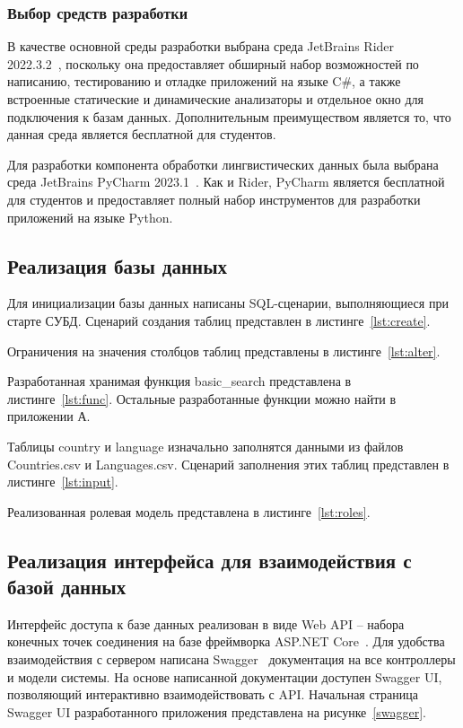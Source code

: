 \subsubsection{Выбор средств разработки}

В качестве основной среды разработки выбрана среда JetBrains Rider\\ 2022.3.2~\cite{rider}, поскольку она предоставляет обширный набор возможностей по написанию, тестированию и отладке приложений на языке C$\#$, а также встроенные статические и динамические анализаторы и отдельное окно для подключения к базам данных. 
Дополнительным преимуществом является то, что данная среда является бесплатной для студентов.

Для разработки компонента обработки лингвистических данных была выбрана среда JetBrains PyCharm 2023.1~\cite{pycharm}. 
Как и Rider, PyCharm является бесплатной для студентов и предоставляет полный набор инструментов для разработки приложений на языке Python.


\subsection{Реализация базы данных}

Для инициализации базы данных написаны SQL-сценарии, выполняющиеся при старте СУБД. 
Сценарий создания таблиц представлен в листинге~\ref{lst:create}.

Ограничения на значения столбцов таблиц представлены в листинге~\ref{lst:alter}.

Разработанная хранимая функция basic\_search представлена в листинге~\ref{lst:func}. 
Остальные разработанные функции можно найти в приложении А.

Таблицы country и language изначально заполнятся данными из файлов Countries.csv и Languages.csv. Сценарий заполнения этих таблиц представлен в листинге~\ref{lst:input}.

Реализованная ролевая модель представлена в листинге~\ref{lst:roles}.

\subsection{Реализация интерфейса для взаимодействия с базой данных}

Интерфейс доступа к базе данных реализован в виде Web API -- набора конечных точек соединения на базе фреймворка ASP.NET Core~\cite{aspnet}. 
Для удобства взаимодействия с сервером написана Swagger~\cite{swagger} документация на все контроллеры и модели системы. На основе написанной документации доступен Swagger UI, позволяющий интерактивно взаимодействовать с API. 
Начальная страница Swagger UI разработанного приложения представлена на рисунке~\ref{swagger}.

